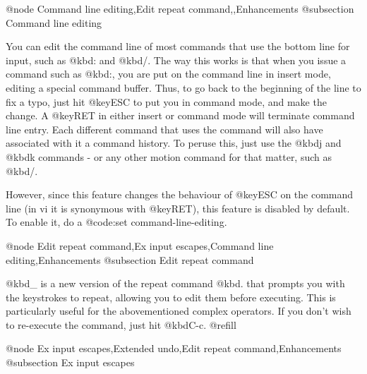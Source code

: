@node Command line editing,Edit repeat command,,Enhancements
@subsection Command line editing

You can edit the command line of most commands that use the bottom line for
input, such as @kbd{:} and @kbd{/}.  The way this works is that when you
issue a command such as @kbd{:}, you are put on the command line in insert
mode, editing a special command buffer.  Thus, to go back to the beginning
of the line to fix a typo, just hit @key{ESC} to put you in command mode,
and make the change.  A @key{RET} in either insert or command mode will
terminate command line entry.  Each different command that uses the command
will also have associated with it a command history.  To peruse this, just
use the @kbd{j} and @kbd{k} commands - or any other motion command for that
matter, such as @kbd{/}.

However, since this feature changes the behaviour of @key{ESC} on the command
line (in vi it is synonymous with @key{RET}), this feature is disabled by
default.  To enable it, do a @code{:set command-line-editing}.

@node Edit repeat command,Ex input escapes,Command line editing,Enhancements
@subsection Edit repeat command

@kbd{_} is a new version of the repeat command @kbd{.}
that prompts you with the
keystrokes to repeat, allowing you to edit them before executing.  This
is particularly useful for the abovementioned complex operators.  If you
don't wish to re-execute the command, just hit @kbd{C-c}. @refill

@node Ex input escapes,Extended undo,Edit repeat command,Enhancements
@subsection Ex input escapes


